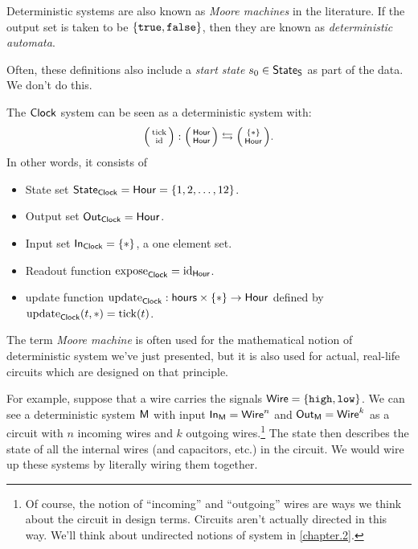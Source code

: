 \documentclass[DynamicalBook]{subfiles}
\begin{document}
\begin{remark}
  Deterministic systems are also known as \emph{Moore machines} in the
  literature. If the output set is taken to be $\{\mathtt{true},
  \mathtt{false}\}$, then they are known as \emph{deterministic automata}.

  Often, these definitions also include a \emph{start state} $s_0 \in \mathsf{State}_{\mathsf{S}}$
  as part of the data. We don't do this.
\end{remark}

\begin{example}\label{ex.clock_system}
  The $\mathsf{Clock}$ system can be seen as a deterministic system with:
  $$\lens{\fun{tick}}{\id} : \lens{\Set{Hour}}{\Set{Hour}} \fromto \lens{\{\ast\}}{\Set{Hour}}.$$
  In other words, it consists of
  \begin{itemize}
  \item State set $\mathsf{State}_{\mathsf{Clock}} = \mathsf{Hour} =\{1,2,\ldots,12\}$.
  \item Output set $\mathsf{Out}_{\mathsf{Clock}} = \mathsf{Hour}$.
  \item Input set $\mathsf{In}_{\mathsf{Clock}} = \{\ast\}$, a one element set.
  \item Readout function $\mathrm{expose}_{\mathsf{Clock}} = \mathrm{id}_{\mathsf{Hour}}$.
  \item update function $\mathrm{update}_{\mathsf{Clock}} : \mathsf{hours} \times \{\ast\} \to \mathsf{Hour}$
    defined by $\mathrm{update}_{\mathsf{Clock}}(t, \ast) = \mathrm{tick}(t)$.
  \end{itemize}
\end{example}

\begin{example}\label{ex.moore_machine}
  The term \emph{Moore machine} is often used for the mathematical notion of
  deterministic system we've just presented, but it is also used for actual,
  real-life circuits which are designed on that principle.

  For example, suppose that a wire carries the signals $\mathsf{Wire} =
  \{\mathtt{high}, \mathtt{low}\}$. We can see a deterministic system $\mathsf{M}$
  with input $\mathsf{In}_{\mathsf{M}} = \mathsf{Wire}^n$ and $\mathsf{Out}_{\mathsf{M}} = \mathsf{Wire}^k$ as a circuit
  with $n$ incoming wires and $k$ outgoing wires.\footnote{Of course, the notion
  of ``incoming'' and ``outgoing'' wires are ways we think about the circuit in
  design terms. Circuits aren't actually directed in this way. We'll think about
undirected notions of system in \cref{chapter.2}.} The state then describes the
state of all the internal wires (and capacitors, etc.) in the circuit. We would wire up these systems by literally wiring them together. 

\end{example}
\end{document}
